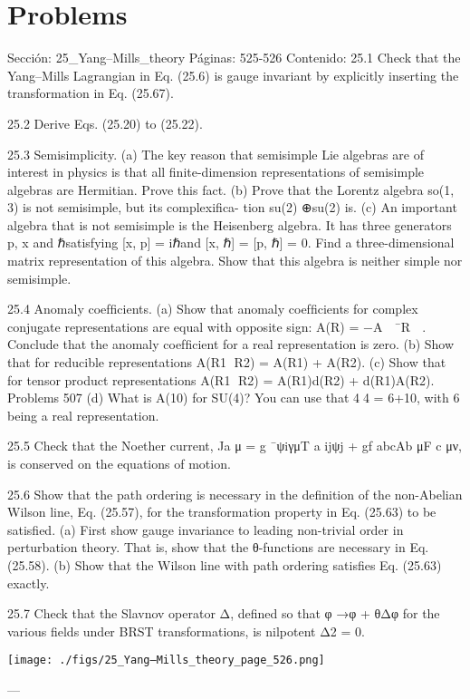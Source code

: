 \section*{Problems}
Sección: 25_Yang–Mills_theory
Páginas: 525-526
Contenido:
25.1 Check that the Yang–Mills Lagrangian in Eq. (25.6) is gauge invariant by explicitly
inserting the transformation in Eq. (25.67).

25.2 Derive Eqs. (25.20) to (25.22).

25.3 Semisimplicity.
(a) The key reason that semisimple Lie algebras are of interest in physics is that all
ﬁnite-dimension representations of semisimple algebras are Hermitian. Prove
this fact.
(b) Prove that the Lorentz algebra so(1, 3) is not semisimple, but its complexiﬁca-
tion su(2) ⊕su(2) is.
(c) An important algebra that is not semisimple is the Heisenberg algebra. It has
three generators p, x and ℏsatisfying [x, p] = iℏand [x, ℏ] = [p, ℏ] = 0. Find a
three-dimensional matrix representation of this algebra. Show that this algebra
is neither simple nor semisimple.

25.4 Anomaly coefﬁcients.
(a) Show that anomaly coefﬁcients for complex conjugate representations are equal
with opposite sign: A(R) = −A
 ¯R

. Conclude that the anomaly coefﬁcient for
a real representation is zero.
(b) Show that for reducible representations A(R1 ⊕R2) = A(R1) + A(R2).
(c) Show that for tensor product representations A(R1 ⊗R2) = A(R1)d(R2) +
d(R1)A(R2).
Problems
507
(d) What is A(10) for SU(4)? You can use that 4⊗4 = 6+10, with 6 being a real
representation.

25.5 Check that the Noether current, Ja
μ = g ¯ψiγμT a
ijψj + gf abcAb
μF c
μν, is conserved on
the equations of motion.

25.6 Show that the path ordering is necessary in the deﬁnition of the non-Abelian Wilson
line, Eq. (25.57), for the transformation property in Eq. (25.63) to be satisﬁed.
(a) First show gauge invariance to leading non-trivial order in perturbation theory.
That is, show that the θ-functions are necessary in Eq. (25.58).
(b) Show that the Wilson line with path ordering satisﬁes Eq. (25.63) exactly.

25.7 Check that the Slavnov operator Δ, deﬁned so that φ →φ + θΔφ for the various
ﬁelds under BRST transformations, is nilpotent Δ2 = 0.

\texttt{[image: ./figs/25\_Yang–Mills\_theory\_page\_526.png]}

---

